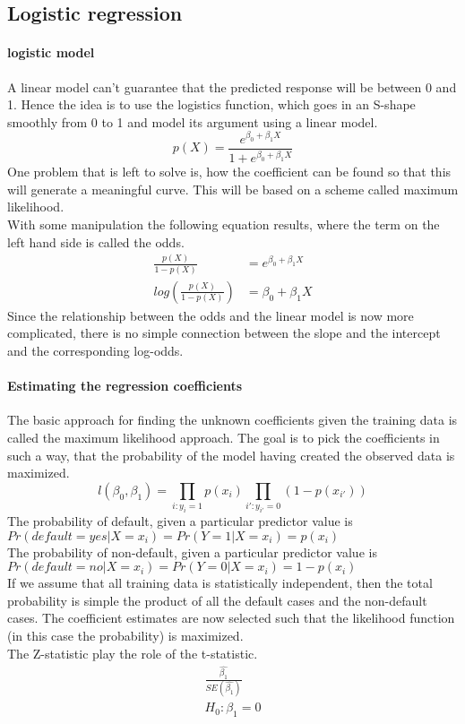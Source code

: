 \documentclass[../document.tex]{subfiles}
\begin{document}
	
	\subsection{Logistic regression}
	\paragraph{logistic model}
	A linear model can't guarantee that the predicted response will be between 0 and 1. Hence the idea is to use the logistics function, which goes in an S-shape smoothly from 0 to 1 and model its argument using a linear model.
	\begin{equation}
		p(X)=\frac{e^{\beta_{0}+\beta_{1}X}}{1+e^{\beta_{0}+\beta_{1}X}}
	\end{equation}
	One problem that is left to solve is, how the coefficient can be found so that this will generate a meaningful curve. This will be based on a scheme called maximum likelihood.\\
	With some manipulation the following equation results, where the term on the left hand side is called the odds.
	\begin{equation}
	\begin{split}
		\frac{p(X)}{1-p(X)}&=e^{\beta_{0}+\beta_{1}X}\\
		log(\frac{p(X)}{1-p(X)})&=\beta_{0}+\beta_{1}X
	\end{split}
	\end{equation}
	Since the relationship between the odds and the linear model is now more complicated, there is no simple connection between the slope and the intercept and the corresponding log-odds.
	\paragraph{Estimating the regression coefficients}
	The basic approach for finding the unknown coefficients given the training data is called the maximum likelihood approach. The goal is to pick the coefficients in such a way, that the probability of the model having created the observed data is maximized.
	\begin{equation}
		l(\beta_{0},\beta_{1})=\prod_{i:y_{i}=1}p(x_{i})\prod_{i':y_{i'}=0}(1-p(x_{i'}))
	\end{equation}
	The probability of default, given a particular predictor value is \(Pr(default=yes|X=x_{i})=Pr(Y=1|X=x_{i})=p(x_{i})\)\\
	The probability of non-default, given a particular predictor value is \(Pr(default=no|X=x_{i})=Pr(Y=0|X=x_{i})=1-p(x_{i})\)\\
	If we assume that all training data is statistically independent, then the total probability is simple the product of all the default cases and the non-default cases. The coefficient estimates are now selected such that the likelihood function (in this case the probability) is maximized.\\
	The Z-statistic play the role of the t-statistic.
	\begin{equation}
	\begin{split}
		\frac{\hat{\beta_{1}}}{SE(\hat{\beta_{1}})}\\
		H_{0}:\beta_{1}=0
	\end{split}
	\end{equation}
\end{document}

